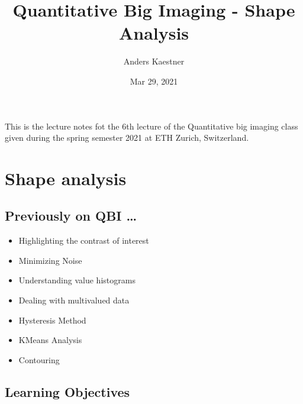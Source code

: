 \documentclass[letterpaper,10pt,english]{sphinxmanual}
\title{Quantitative Big Imaging - Shape Analysis}
\date{Mar 29, 2021}
\author{Anders Kaestner}
\begin{document}
\pagestyle{empty}
\sphinxmaketitle
\pagestyle{plain}
\sphinxtableofcontents
\pagestyle{normal}
\label{\detokenize{preface::doc}}


\sphinxAtStartPar
This is the lecture notes fot the 6th lecture of the Quantitative big imaging class given during the spring semester 2021 at ETH Zurich, Switzerland.


\chapter{Shape analysis}
\label{\detokenize{06-ShapeAnalysis:shape-analysis}}\label{\detokenize{06-ShapeAnalysis::doc}}





\section{Previously on QBI …}
\label{\detokenize{06-ShapeAnalysis:previously-on-qbi}}

\begin{itemize}
\item {} 
\sphinxAtStartPar
Highlighting the contrast of interest

\item {} 
\sphinxAtStartPar
Minimizing Noise



\item {} 
\sphinxAtStartPar
Understanding value histograms

\item {} 
\sphinxAtStartPar
Dealing with multi\sphinxhyphen{}valued data



\item {} 
\sphinxAtStartPar
Hysteresis Method

\item {} 
\sphinxAtStartPar
K\sphinxhyphen{}Means Analysis



\item {} 
\sphinxAtStartPar
Contouring



\end{itemize}


\section{Learning Objectives}
\label{\detokenize{06-ShapeAnalysis:learning-objectives}}
\end{document}
